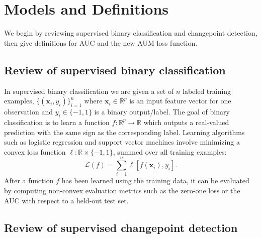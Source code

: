 \documentclass{article}
\begin{document}
\section{Models and Definitions}
\label{sec:model}
We begin by reviewing supervised binary classification and changepoint detection, then give definitions for AUC and the new AUM loss function.
\subsection{Review of supervised binary classification}

In supervised binary classification we are given a set of $n$ labeled training examples, $\{(\mathbf x_i, y_i)\}_{i=1}^n$ where $\mathbf x_i\in\mathbb R^p$ is an input feature vector for one observation and $y_i\in\{-1,1\}$ is a binary output/label.
The goal of binary classification is to learn a function $f:\mathbb R^p\rightarrow \mathbb R$ which outputs a real-valued prediction with the same sign as the corresponding label.
Learning algorithms such as logistic regression and support vector machines involve minimizing a convex loss function $\ell:\mathbb R\times \{-1,1\}$, summed over all training examples:
\begin{equation}
\label{eq:loss-sum-over-examples}
    \mathcal L(f) =  \sum_{i=1}^n \ell[ f(\mathbf x_i), y_i].
\end{equation}
After a function $f$ has been learned using the training data, it can be evaluated by computing non-convex evaluation metrics such as the zero-one loss or the AUC with respect to a held-out test set.

\subsection{Review of supervised changepoint detection}
\end{document}
